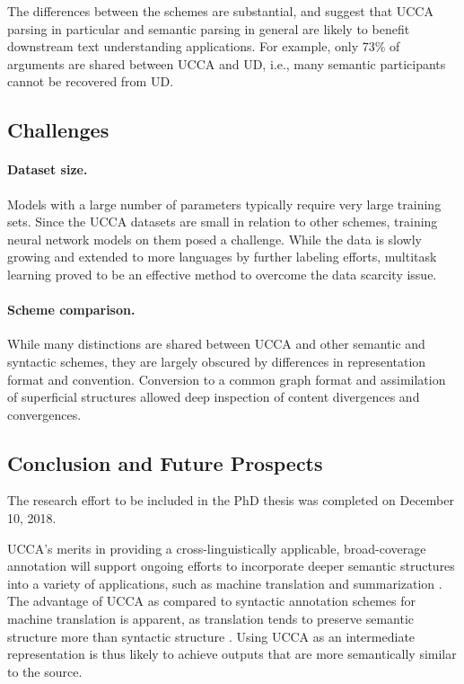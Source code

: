 \documentclass[12pt]{report}
\begin{document}
  The differences between the schemes are substantial, and suggest that
  UCCA parsing in particular and semantic parsing in general are likely to benefit
  downstream text understanding applications.
  For example, only 73\% of arguments are shared between UCCA and UD,
  i.e., many semantic participants cannot be recovered from UD.

\subsection*{Challenges}

\paragraph{Dataset size.}
Models with a large number of parameters typically require very large
training sets.
Since the UCCA datasets are small in relation to other schemes,
training neural network models on them posed a challenge.
While the data is slowly growing and extended to more languages by further labeling efforts,
multitask learning proved to be an effective method to overcome the data scarcity issue.

\paragraph{Scheme comparison.}
While many distinctions are shared between UCCA and other semantic and syntactic schemes,
they are largely obscured by differences in representation format and convention.
Conversion to a common graph format and assimilation of superficial structures
allowed deep inspection of content divergences and convergences.


\subsection*{Conclusion and Future Prospects}

The research effort to be included in the PhD thesis was completed on December 10, 2018.

UCCA's merits in providing a cross-linguistically applicable,
broad-coverage annotation will support ongoing efforts to incorporate deeper
semantic structures into a variety of applications, such as machine translation
\citep{jones2012semantics} and summarization \citep{liu2015toward}.
The advantage of UCCA as compared to syntactic annotation schemes for machine translation is apparent,
as translation tends to preserve semantic structure more than syntactic structure \citep{sulem2015conceptual}.
Using UCCA as an intermediate representation is thus likely to achieve outputs that are more
semantically similar to the source.
\end{document}
